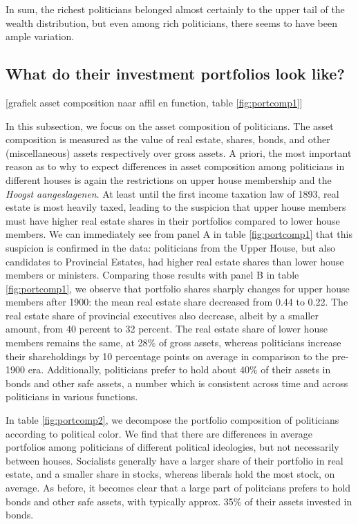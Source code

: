     In sum, the richest politicians belonged almost certainly to the upper tail of the wealth distribution, but even among rich politicians, there seems to have been ample variation. 
    

\subsection{What do their investment portfolios look like?}

\begin{center}    
    [grafiek asset composition naar affil en function, table \ref{fig:portcomp1}]
    
\end{center}
    
    In this subsection, we focus on the asset composition of politicians. The asset composition is measured as the value of real estate, shares, bonds, and other (miscellaneous) assets respectively over gross assets. A priori, the most important reason as to why to expect differences in asset composition among politicians in different houses is again the restrictions on upper house membership and the \textit{Hoogst aangeslagenen}. At least until the first income taxation law of 1893, real estate is most heavily taxed, leading to the suspicion that upper house members must have higher real estate shares in their portfolios compared to lower house members. We can immediately see from panel A in table \ref{fig:portcomp1} that this suspicion is confirmed in the data: politicians from the Upper House, but also candidates to Provincial Estates, had higher real estate shares than lower house members or ministers. Comparing those results with panel B in table \ref{fig:portcomp1}, we observe that portfolio shares sharply changes for upper house members after 1900: the mean real estate share decreased from 0.44 to 0.22. The real estate share of provincial executives also decrease, albeit by a smaller amount, from 40 percent to 32 percent. The real estate share of lower house members remains the same, at 28\% of gross assets, whereas politicians increase their shareholdings by 10 percentage points on average in comparison to the pre-1900 era. Additionally, politicians prefer to hold about 40\% of their assets in bonds and other safe assets, a number which is consistent across time and across politicians in various functions. 
    
    In table \ref{fig:portcomp2}, we decompose the portfolio composition of politicians according to political color. We find that there are differences in average portfolios among politicians of different political ideologies, but not necessarily between houses. Socialists generally have a larger share of their portfolio in real estate, and a smaller share in stocks, whereas liberals hold the most stock, on average. As before, it becomes clear that a large part of politcians prefers to hold bonds and other safe assets, with typically approx. 35\% of their assets invested in bonds. 

